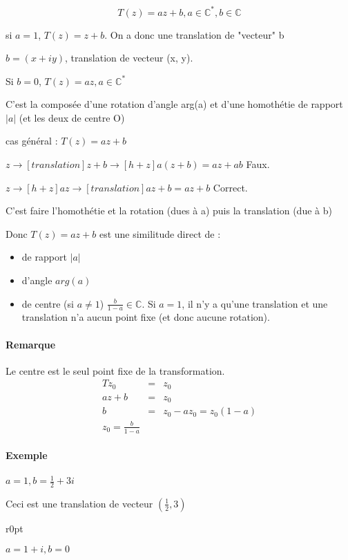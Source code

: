 \[T(z) = az + b, a \in \mathbb{C}^*, b \in \mathbb{C}\]

si $a=1$, $T(z) = z+b$. On a donc une translation de "vecteur" b

$b=(x+iy)$, translation de vecteur (x, y).

Si $b=0$, $T(z) =az, a \in \mathbb{C}^*$

C'est la composée d'une rotation d'angle arg(a) et d'une homothétie de rapport $|a|$ (et les deux de centre O)

cas général : $T(z) = az + b$

$z \rightarrow[translation]{} z+b \rightarrow[h+z]{} a(z+b) = az + ab$ Faux.

$z \rightarrow[h+z]{} az \rightarrow[translation]{} az + b = az + b$ Correct.

C'est faire l'homothétie et la rotation (dues à a) puis la translation (due à b)

Donc $T(z) =az + b$ est une similitude direct de :
\begin{itemize}
	\item de rapport $|a|$ 
	\item d'angle $arg(a)$
	\item de centre (si $a \neq 1$) $\frac{b}{1-a} \in \mathbb{C}$. Si $a=1$, il n'y a qu'une translation et une translation n'a aucun point fixe (et donc aucune rotation).
\end{itemize}

\paragraph{Remarque} Le centre est le seul point fixe de la transformation.
\[\begin{array}{rcl}
T{z_0} &=& z_0 \\
az + b &=&  z_0 \\
b &=& z_0 - az_0 = z_0(1-a) \\
z_0 = \frac{b}{1-a}
\end{array}\]

\paragraph{Exemple} $a=1, b = \frac{1}{2} + 3i$

Ceci est une translation de vecteur $(\frac{1}{2}, 3)$

\begin{wrapfigure}[6]{r}{0pt}
\end{wrapfigure}
$a = 1+i, b=0$


